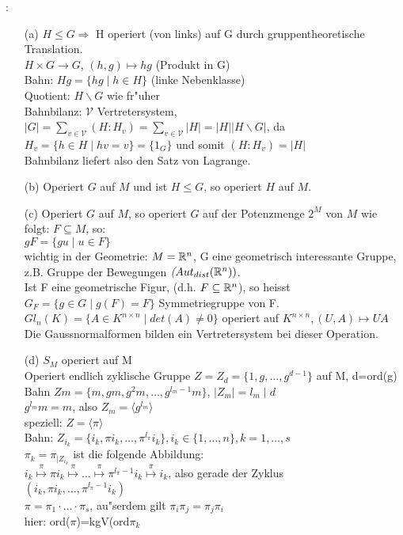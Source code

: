 \example{}:{
  \begin{enumerate}
    \item[(a)]$H \leq G \Rightarrow $ H operiert (von links) auf G durch gruppentheoretische Translation. \\
     $H \times G \longrightarrow G $,
     $(h,g) \mapsto hg$  (Produkt in G)\\
     Bahn: $Hg = \{ hg \mid h\in H \}$  (linke Nebenklasse)\\
	 Quotient: $H \backslash G$ wie fr"uher\\
     Bahnbilanz: $\mathcal{V}$ Vertretersystem, $|G| =\sum_{v\in\mathcal{V}} (H:H_v) = 
     \sum_{v\in \mathcal{V}} |H| = |H| |H\backslash G|$, da\\
     $H_v = \{h\in H \mid hv=v \} = \{ 1_G \}$ und somit $(H:H_v) =|H|$\\
     Bahnbilanz liefert also den Satz von Lagrange.
    \item[(b)] Operiert $G$ auf $M$ und ist $H\leq G$, so operiert $H$ auf $M$.
	\item[(c)] Operiert $G$ auf $M$, so operiert $G$ auf der Potenzmenge $2^M$ von $M$ wie folgt: $ F \subseteq M$, so:\\
	   $gF = \{ gu \mid u\in F \}$\\
	   wichtig in der Geometrie: $M = \mathbb R^n$, G eine geometrisch interessante Gruppe, z.B. 
	   Gruppe der Bewegungen ${\emph (Aut_{dist}(\mathbb R^n))}$.\\
	   Ist F eine geometrische Figur,
	   (d.h. $F\subseteq \mathbb R^n$), so heisst ${G_F =\{g\in G \mid g(F) = F \}}$ Symmetriegruppe von F.\\
	  $Gl_n(K) = \{A\in K^{n \times n} \mid det(A) \neq 0 \}$ operiert auf $K^{n \times n}, 
	  (U,A) \mapsto UA $\\
	  Die Gaussnormalformen bilden ein Vertretersystem bei dieser Operation.
    \item[(d)]  $S_M$ operiert auf M \\
	  Operiert endlich zyklische Gruppe $Z=Z_d=\{1,g, \ldots, g^{d-1} \}$ auf M, d=ord(g)\\
	  Bahn $Zm =\{ m, gm, g^2m, \ldots, g^{l_m - 1}m \}$, $|Z_m| = l_m \mid d$ \\
	  $g^{l_m}m = m$, also
	  $Z_m = \langle g^{l_m} \rangle $\\
	  speziell: $Z = \langle \pi \rangle$	\\
	  Bahn: $Z_{i_k} = \{i_k, \pi i_k, \ldots, \pi^{l_{\pi}}i_k \}, i_k \in \{1,
	  \ldots, n\}, {k=1, \ldots, s}$ \\
	  $\pi_k = \pi_{|Z_{i_k}}$  ist die folgende Abbildung: \\
	  $i_k \stackrel{\pi}{\mapsto} \pi i_k \stackrel{\pi}{\mapsto} \ldots \stackrel{\pi}{\mapsto}
	  \pi^{l_{\pi} - 1} i_k \stackrel{\pi}{\mapsto} i_k $, also gerade der Zyklus\\
	  $(i_k, \pi i_k, \ldots, \pi^{l_{\pi} - 1}i_k)$\\
	  $\pi = \pi_1 \cdot \ldots \cdot \pi_s$, au"serdem gilt $\pi_i \pi_j = \pi_j \pi_i$\\
	  hier: ord($\pi$)=kgV(ord$\pi_k$		  
 \end{enumerate}			  
          }
